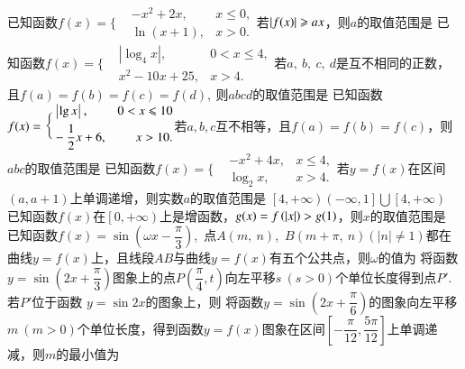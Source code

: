 \documentclass{BHCexam}
\begin{document}
\begin{questions}
\question
已知函数$f(x)=\Bigg\{\begin{aligned}
&-x^2+2x,&x\le0,\\
&\ln(x+1),&x>0.
\end{aligned}$若$\left| f(x) \right|\geqslant ax$，则$a$的取值范围是\xx
\onech{$\left(-\infty,0\right]$}{$\left(-\infty,1\right]$}{$\left[-2,-1\right]$}{$\left[-2,0\right]$}
\qs 已知函数$f(x)=\Bigg\{\begin{aligned}
&\left|\log_4x\right|,&0<x\le 4,\\&x^2-10x+25,&x>4.
\end{aligned}$若$ a,~b,~c,~d $是互不相同的正数，且$ f(a)=f(b)=f(c)=f(d),~ $则$ abcd $的取值范围是\xx
{}
\qs 已知函数$f(x)=\Bigg\{\begin{aligned}
&\left| \lg x \right|,&0<x\leqslant10 \\
&-\dfrac{1}{2}x+6,&x>10.
\end{aligned}$若$ a,b,c $互不相等，且$ f(a)=f(b)=f(c) $，则$ abc $的取值范围是\xx
{}
\qs 已知函数$f(x)=\Bigg\{\begin{aligned}
&-x^2+4x,&x\le 4,\\
&\log_2x,&x>4.
\end{aligned}$若$y=f(x)$在区间$ \left(a,a+1\right) $上单调递增，则实数$ a $的取值范围是\xx
\onech{$ \left(-\infty,1\right] $}{$ \left[1,4\right] $} {$ \left[4,+\infty\right) $}{$ \left(-\infty,1\right]\bigcup\left[4,+\infty\right) $}
\qs 已知函数$f(x)$在$ \left[0,+\infty\right) $上是增函数，$ g(x)=f\left(\left| x \right|\right) >g(1)$，则$ x $的取值范围是\xx
{}
\qs 已知函数$f(x)=\sin (\omega x-\dfrac{\pi}{3})$,~点$ A(m,~n) $,~$ B(m+\pi,~n) (\left|n\right|\ne 1)$都在曲线$ y=f(x) $上，且线段$ AB $与曲线$ y=f(x) $有五个公共点，则$ \omega $的值为\xx
{}
\qs 将函数$ y=\sin\left(2x+\dfrac{\pi}{3}\right) $图象上的点$ P\left(\dfrac{\pi}{4},t\right) $向左平移$ s~(s>0) $个单位长度得到点$ P' $.若$ P' $位于函数 $ y=\sin 2x $的图象上，则\xx
{}
\qs 将函数$ y=\sin (2x+\dfrac{\pi}{6}) $的图象向左平移$ m~(m>0) $个单位长度，得到函数$ y=f(x) $图象在区间$ \left[-\dfrac{\pi}{12},\dfrac{5\pi}{12}\right] $上单调递减，则$ m $的最小值为\xx

\end{questions}
\end{document}
